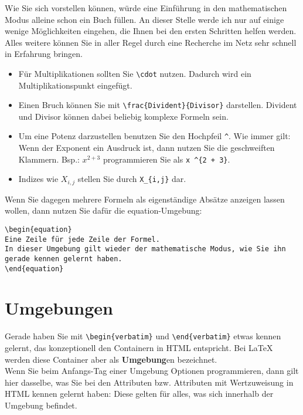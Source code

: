 Wie Sie sich vorstellen können, würde eine Einführung in den mathematischen Modus alleine schon ein Buch füllen. An dieser Stelle werde ich nur auf einige wenige Möglichkeiten eingehen, die Ihnen bei den ersten Schritten helfen werden. Alles weitere können Sie in aller Regel durch eine Recherche im Netz sehr schnell in Erfahrung bringen.

\begin{itemize}
	\item Für Multiplikationen sollten Sie \verb|\cdot| nutzen. Dadurch wird ein Multiplikationspunkt eingefügt.
	\item Einen Bruch können Sie mit \verb|\frac{Divident}{Divisor}| darstellen. Divident und Divisor können dabei beliebig komplexe Formeln sein.
	\item Um eine Potenz darzustellen benutzen Sie den Hochpfeil \verb|^|. Wie immer gilt: Wenn der Exponent ein Ausdruck ist, dann nutzen Sie die geschweiften Klammern. Bsp.: \(x^{2 + 3}\) programmieren Sie als \verb|x ^{2 + 3}|.
	\item Indizes wie \(X_{i,j}\) stellen Sie durch \verb|X_{i,j}| dar.
\end{itemize}

Wenn Sie dagegen mehrere Formeln als eigenständige Absätze anzeigen lassen wollen, dann nutzen Sie dafür die equation-Umgebung:

\begin{verbatim}
\begin{equation}
Eine Zeile für jede Zeile der Formel.
In dieser Umgebung gilt wieder der mathematische Modus, wie Sie ihn gerade kennen gelernt haben.
\end{equation}
\end{verbatim}

\section{Umgebungen}

Gerade haben Sie mit \verb|\begin{verbatim}| und \verb|\end{verbatim}| etwas kennen gelernt, das konzeptionell den Containern in HTML entspricht. Bei LaTeX werden diese Container aber als \textbf{Umgebung}en bezeichnet.\\

Wenn Sie beim Anfangs-\glqq{}Tag\grqq{} einer Umgebung Optionen programmieren, dann gilt hier dasselbe, was Sie bei den Attributen bzw. Attributen mit Wertzuweisung in HTML kennen gelernt haben: Diese gelten für alles, was sich innerhalb der Umgebung befindet.

